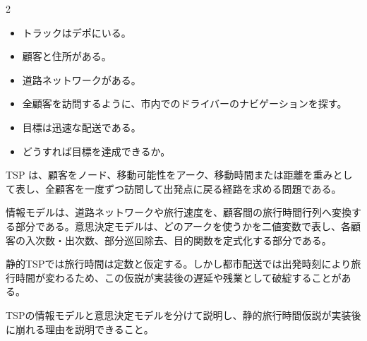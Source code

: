 
\vspace{1.5mm}

\begin{multicols}{2}

\footnotesize

\raggedcolumns


\begin{itemize}
\item トラックはデポにいる。
\item 顧客と住所がある。
\item 道路ネットワークがある。
\item 全顧客を訪問するように、市内でのドライバーのナビゲーションを探す。
\item 目標は迅速な配送である。
\item どうすれば目標を達成できるか。
\end{itemize}

TSP は、顧客をノード、移動可能性をアーク、移動時間または距離を重みとして表し、全顧客を一度ずつ訪問して出発点に戻る経路を求める問題である。\par

情報モデルは、道路ネットワークや旅行速度を、顧客間の旅行時間行列へ変換する部分である。意思決定モデルは、どのアークを使うかを二値変数で表し、各顧客の入次数・出次数、部分巡回除去、目的関数を定式化する部分である。\par

静的TSPでは旅行時間は定数と仮定する。しかし都市配送では出発時刻により旅行時間が変わるため、この仮説が実装後の遅延や残業として破綻することがある。\par

TSPの情報モデルと意思決定モデルを分けて説明し、静的旅行時間仮説が実装後に崩れる理由を説明できること。\par


\end{multicols}
